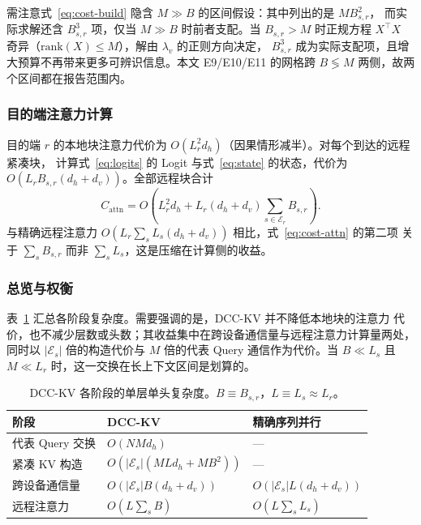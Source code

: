 需注意式~\eqref{eq:cost-build} 隐含 $M \gg B$ 的区间假设：其中列出的是 $M B_{s,r}^2$，
而实际求解还含 $B_{s,r}^3$ 项，仅当 $M \gg B$ 时前者支配。当 $B_{s,r} > M$ 时正规方程
$X^\top X$ 奇异（$\mathrm{rank}(X) \le M$），解由 $\lambda_v$ 的正则方向决定，
$B_{s,r}^3$ 成为实际支配项，且增大预算不再带来更多可辨识信息。本文 E9/E10/E11 的网格跨
$B \lessgtr M$ 两侧，故两个区间都在报告范围内。

\subsubsection{目的端注意力计算}

目的端 $r$ 的本地块注意力代价为 $O(L_r^2 d_h)$（因果情形减半）。对每个到达的远程紧凑块，
计算式~\eqref{eq:logits} 的 Logit 与式~\eqref{eq:state} 的状态，代价为 $O(L_r B_{s,r}(d_h + d_v))$。全部远程块合计
\begin{equation}
\label{eq:cost-attn}
C_{\text{attn}} = O\!\left(L_r^2 d_h + L_r (d_h + d_v) \textstyle\sum_{s \in \mathcal{E}_r} B_{s,r}\right).
\end{equation}
与精确远程注意力 $O(L_r \sum_{s} L_s (d_h+d_v))$ 相比，式~\eqref{eq:cost-attn} 的第二项
关于 $\sum_s B_{s,r}$ 而非 $\sum_s L_s$，这是压缩在计算侧的收益。

\subsubsection{总览与权衡}

表~\ref{tab:complexity} 汇总各阶段复杂度。需要强调的是，DCC-KV 并不降低本地块的注意力
代价，也不减少层数或头数；其收益集中在跨设备通信量与远程注意力计算量两处，同时以
$|\mathcal{E}_s|$ 倍的构造代价与 $M$ 倍的代表 Query 通信作为代价。当 $B \ll L_s$
且 $M \ll L_r$ 时，这一交换在长上下文区间是划算的。

\begin{table}[t]
\centering
\small
\caption{DCC-KV 各阶段的单层单头复杂度。$B \equiv B_{s,r}$，$L \equiv L_s \approx L_r$。}
\label{tab:complexity}
\begin{tabular}{lll}
\toprule
阶段 & DCC-KV & 精确序列并行 \\
\midrule
代表 Query 交换 & $O(N M d_h)$ & --- \\
紧凑 KV 构造 & $O(|\mathcal{E}_s|(M L d_h + M B^2))$ & --- \\
跨设备通信量 & $O(|\mathcal{E}_s| B (d_h+d_v))$ & $O(|\mathcal{E}_s| L (d_h+d_v))$ \\
远程注意力 & $O(L \sum_s B)$ & $O(L \sum_s L_s)$ \\
\bottomrule
\end{tabular}
\end{table}

